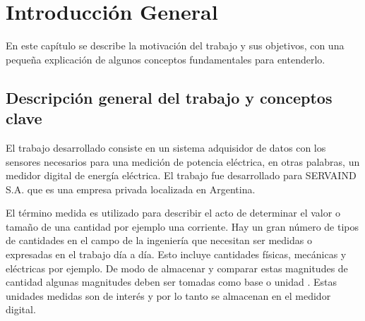 
\chapter{Introducción General} %
En este capítulo se describe la motivación del trabajo y sus objetivos, con una pequeña explicación de algunos conceptos fundamentales para entenderlo.

\label{Chapter1} %


\newcommand{\keyword}[1]{\textbf{#1}}
\newcommand{\tabhead}[1]{\textbf{#1}}
\newcommand{\code}[1]{\texttt{#1}}
\newcommand{\file}[1]{\texttt{\bfseries#1}}
\newcommand{\option}[1]{\texttt{\itshape#1}}
\newcommand{\grados}{$^{\circ}$}



\section{Descripción general del trabajo y conceptos clave}

El trabajo desarrollado consiste en un sistema adquisidor de datos con los sensores necesarios para una medición de potencia eléctrica, en otras palabras, un medidor digital de energía eléctrica. El trabajo fue desarrollado para SERVAIND S.A. que es una empresa privada localizada en Argentina.

El término medida es utilizado para describir el acto de determinar el valor o tamaño de una cantidad por ejemplo una corriente. Hay un gran número de tipos de cantidades en el campo de la ingeniería que necesitan ser medidas o expresadas en el trabajo día a día. Esto incluye cantidades físicas, mecánicas y eléctricas por ejemplo. De modo de almacenar y comparar estas magnitudes de cantidad algunas magnitudes deben ser tomadas como base o unidad \citep{book:1689974}. Estas unidades medidas son de interés y por lo tanto se almacenan en el medidor digital.

